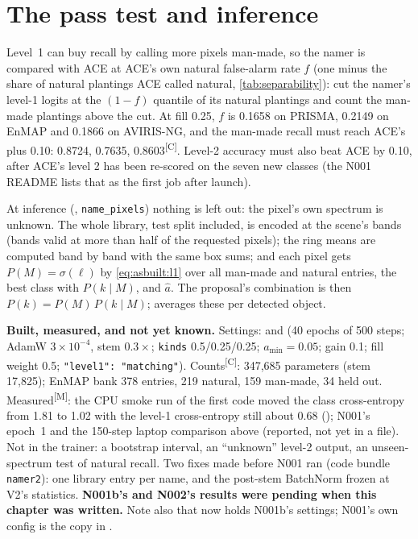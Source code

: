 \documentclass[11pt,a4paper,oneside,openany]{book}
\newcommand{\meas}{\textsuperscript{\textsf{\scriptsize[M]}}}
\newcommand{\comp}{\textsuperscript{\textsf{\scriptsize[C]}}}
\newcommand{\ahat}{\hat a}
\begin{document}
\section{The pass test and inference}

Level~1 can buy recall by calling more pixels man-made, so the namer is compared with ACE at ACE's own natural false-alarm rate $f$ (one minus the share of natural plantings
ACE called natural, \cref{tab:separability}): cut the namer's level-1 logits at the $(1-f)$ quantile of its natural plantings and count the man-made plantings above the
cut. At fill 0.25, $f$ is 0.1658 on PRISMA, 0.2149 on EnMAP and 0.1866 on AVIRIS-NG, and the man-made recall must reach ACE's plus 0.10: 0.8724, 0.7635, 0.8603\comp.
Level-2 accuracy must also beat ACE by 0.10, after ACE's level 2 has been re-scored on the seven new classes (the N001 README lists that as the first job after launch).

At inference (, \texttt{name\_pixels}) nothing is left out: the pixel's own spectrum is unknown. The whole library, test split included, is encoded at the
scene's bands (bands valid at more than half of the requested pixels); the ring means are computed band by band with the same box sums; and each pixel gets
$P(M)=\sigma(\ell)$ by \cref{eq:asbuilt:l1} over all man-made and natural entries, the best class with $P(k\mid M)$, and $\ahat$. The proposal's combination is then
$P(k)=P(M)\,P(k\mid M)$;  averages these per detected object.

\begin{fromsource}
\textbf{Built, measured, and not yet known.} Settings:  and  (40 epochs of 500 steps; AdamW $3\times10^{-4}$, stem $0.3\times$;
\texttt{kinds} 0.5/0.25/0.25; $a_{\min}=0.05$; gain 0.1; fill weight 0.5; \texttt{"level1": "matching"}). Counts\comp: 347,685 parameters (stem 17,825); EnMAP bank 378
entries, 219 natural, 159 man-made, 34 held out. Measured\meas: the CPU smoke run of the first code moved the class cross-entropy from 1.81 to 1.02 with the level-1
cross-entropy still about 0.68 (); N001's epoch~1 and the 150-step laptop comparison above (reported, not yet in a file).
Not in the trainer: a bootstrap interval, an ``unknown'' level-2 output, an unseen-spectrum test of natural recall. Two fixes made before N001 ran (code bundle
\texttt{namer2}): one library entry per name, and the post-stem BatchNorm frozen at V2's statistics. \textbf{N001b's and N002's results were pending when this chapter was
written.} Note also that  now holds N001b's settings; N001's own config is the copy in .
\end{fromsource}
\end{document}
